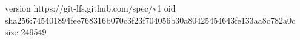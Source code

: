 version https://git-lfs.github.com/spec/v1
oid sha256:745401894fee768316b070c3f23f704056b30a80425454643fe133aa8c782a0c
size 249549
